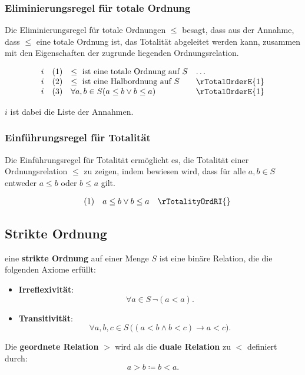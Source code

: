 \documentclass[main.tex]{subfiles}
\begin{document}
\subsubsection*{Eliminierungsregel für totale Ordnung}
\label{rule:rTotalOrderE}
Die Eliminierungsregel für totale Ordnungen \(\leq\) besagt, dass aus der Annahme, dass \(\leq\) eine totale Ordnung ist, das Totalität abgeleitet werden kann, zusammen mit den Eigenschaften der zugrunde liegenden Ordnungsrelation.

\[
\begin{array}{llll}
    i       & (1) & \leq \text{ ist eine totale Ordnung auf } S & \dots \\
    i       & (2) & \leq \text{ ist eine Halbordnung auf } S & \rTotalOrderE{1} \\
    i       & (3) & \forall a, b \in S (a \leq b \lor b \leq a) & \rTotalOrderE{1}
\end{array}
\]

\(i\) ist dabei die Liste der Annahmen.

\subsubsection*{Einführungsregel für Totalität}
\label{rule:rTotalityOrdRI}
Die Einführungsregel für Totalität ermöglicht es, die Totalität einer Ordnungsrelation \(\leq\) zu zeigen, indem bewiesen wird, dass für alle \(a, b \in S\) entweder \(a \leq b\) oder \(b \leq a\) gilt.

\[
\begin{array}{llll}
           & (1) & a \leq b \lor b \leq a & \rTotalityOrdRI{}
\end{array}
\]

\subsection{Strikte Ordnung}

\begin{definition}
    eine \textbf{strikte Ordnung} auf einer Menge \( S \) ist eine binäre Relation, die die folgenden Axiome erfüllt:
    
    \begin{itemize}
        \item \textbf{Irreflexivität}:
        \[
        \forall a \in S \, \neg (a < a).
        \]
        
        \item \textbf{Transitivität}: 
        \[
        \forall a, b, c \in S \, \big( (a < b \land b < c) \rightarrow a < c \big).
        \]
    \end{itemize}

    Die \textbf{geordnete Relation} \(>\) wird als die \textbf{duale Relation} zu \(<\) definiert durch:
    \[
    a > b \coloneqq b < a.
    \]
\end{definition}
\end{document}
